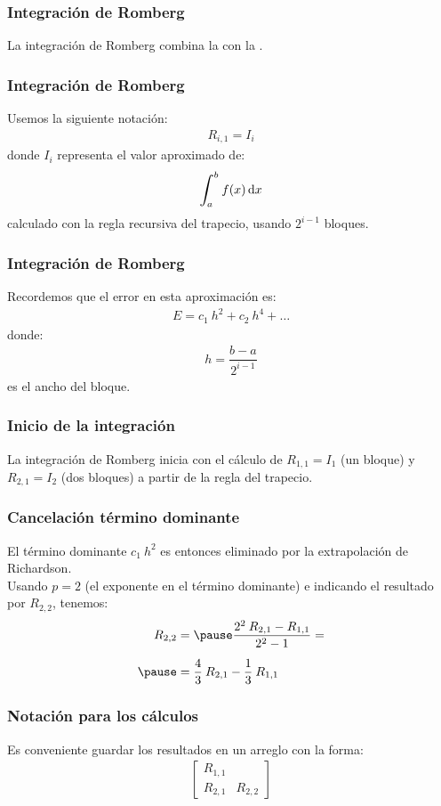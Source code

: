 \documentclass[12pt]{beamer}
\begin{document}
\begin{frame}
\frametitle{Integración de Romberg}
La integración de Romberg combina la  con la . 
\end{frame}
\begin{frame}
\frametitle{Integración de Romberg}
Usemos la siguiente notación:
\pause
\begin{align*}
R_{i, 1} = I_{i}
\end{align*}
donde $I_{i}$ representa el valor aproximado de:
\begin{align*}
\scaleint{6ex}_{\bs a}^{b} \: f (x) \dd{x}
\end{align*}
calculado con la regla recursiva del trapecio, usando $2^{i - 1}$ bloques.
\end{frame}
\begin{frame}
\frametitle{Integración de Romberg}
Recordemos que el error en esta aproximación es:
\pause
\begin{align*}
E = c_{1} \: h^{2} + c_{2} \: h^{4} + \ldots
\end{align*}
donde:
\begin{align*}
h = \dfrac{b - a}{2^{i - 1}}
\end{align*}
es el ancho del bloque.
\end{frame}
\begin{frame}
\frametitle{Inicio de la integración}
La integración de Romberg inicia con el cálculo de $R_{1, 1} = I_{1}$ (un bloque) y $R_{2, 1} = I_{2}$ (dos bloques) a partir de la regla del trapecio.
\end{frame}
\begin{frame}
\frametitle{Cancelación término dominante}
El término dominante $c_{1} \: h^{2}$ es entonces eliminado por la extrapolación de Richardson.
\\
\bigskip
\pause
Usando $p = 2$ (el exponente en el término dominante) e indicando el resultado por $R_{2, 2}$, tenemos:
\pause
\begin{eqnarray*}
\begin{aligned}
R_{2, 2} &= \pause \dfrac{2^{2} \: R_{2, 1} - R_{1, 1}}{2^{2} - 1} = \\[0.5em] \pause 
&= \dfrac{4}{3} \: R_{2, 1} - \dfrac{1}{3} \: R_{1, 1}
\end{aligned}
\end{eqnarray*}
\end{frame}
\begin{frame}
\frametitle{Notación para los cálculos}
Es conveniente guardar los resultados en un arreglo con la forma:
\pause
\begin{align*}
\begin{bmatrix}
R_{1, 1} & \\
R_{2, 1} & R_{2, 2}
\end{bmatrix}
\end{align*}
\end{frame}
\end{document}
